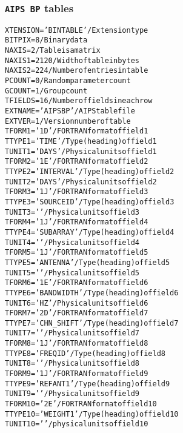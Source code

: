 \documentclass[twoside]{article}
\begin{document}
\subsubsection{{\tt AIPS BP} tables}
\label{Appe:BPtable}
\begin{alltt}
XTENSION= 'BINTABLE'           / Extension type
BITPIX  =                    8 / Binary data
NAXIS   =                    2 / Table is a matrix
NAXIS1  =                 2120 / Width of table in bytes
NAXIS2  =                  224 / Number of entries in table
PCOUNT  =                    0 / Random parameter count
GCOUNT  =                    1 / Group count
TFIELDS =                   16 / Number of fields in each row
EXTNAME = 'AIPS BP '           / AIPS table file
EXTVER  =                    1 / Version number of table
TFORM1  = '1D      '           / FORTRAN format of field  1
TTYPE1  = 'TIME            '   / Type (heading) of field  1
TUNIT1  = 'DAYS    '           / Physical units of field  1
TFORM2  = '1E      '           / FORTRAN format of field  2
TTYPE2  = 'INTERVAL        '   / Type (heading) of field  2
TUNIT2  = 'DAYS    '           / Physical units of field  2
TFORM3  = '1J      '           / FORTRAN format of field  3
TTYPE3  = 'SOURCE ID       '   / Type (heading) of field  3
TUNIT3  = '        '           / Physical units of field  3
TFORM4  = '1J      '           / FORTRAN format of field  4
TTYPE4  = 'SUBARRAY        '   / Type (heading) of field  4
TUNIT4  = '        '           / Physical units of field  4
TFORM5  = '1J      '           / FORTRAN format of field  5
TTYPE5  = 'ANTENNA         '   / Type (heading) of field  5
TUNIT5  = '        '           / Physical units of field  5
TFORM6  = '1E      '           / FORTRAN format of field  6
TTYPE6  = 'BANDWIDTH       '   / Type (heading) of field  6
TUNIT6  = 'HZ      '           / Physical units of field  6
TFORM7  = '2D      '           / FORTRAN format of field  7
TTYPE7  = 'CHN_SHIFT       '   / Type (heading) of field  7
TUNIT7  = '        '           / Physical units of field  7
TFORM8  = '1J      '           / FORTRAN format of field  8
TTYPE8  = 'FREQ ID         '   / Type (heading) of field  8
TUNIT8  = '        '           / Physical units of field  8
TFORM9  = '1J      '           / FORTRAN format of field  9
TTYPE9  = 'REFANT 1        '   / Type (heading) of field  9
TUNIT9  = '        '           / Physical units of field  9
TFORM10 = '2E      '           / FORTRAN format of field 10
TTYPE10 = 'WEIGHT 1        '   / Type (heading) of field 10
TUNIT10 = '        '           / physical units of field 10

\end{alltt}
\end{document}
